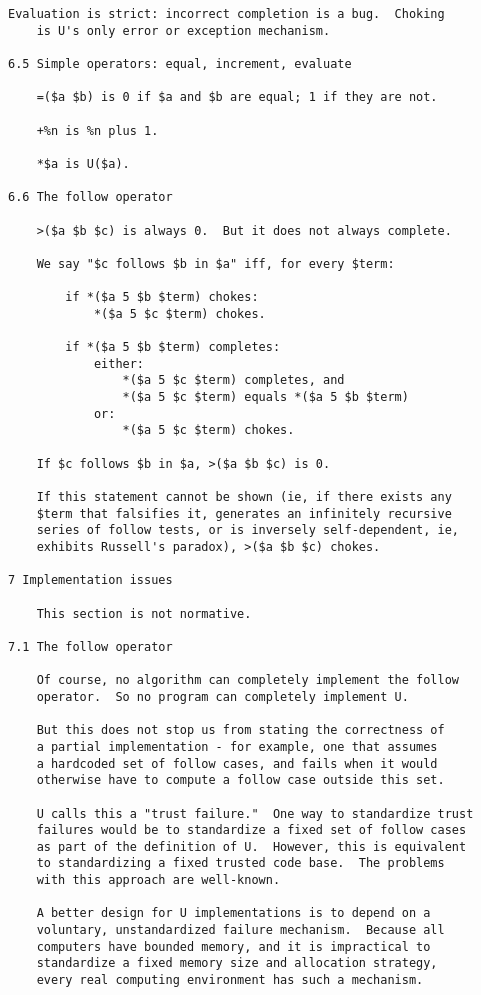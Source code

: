 \documentclass[twoside]{article}
\begin{document}
\begin{lstlisting}[label=lst:u,caption={U: Definition.  The earliest extant Nock.  Only layout has been changed for print.},style=listingcode]
    Evaluation is strict: incorrect completion is a bug.  Choking
    is U's only error or exception mechanism.

6.5 Simple operators: equal, increment, evaluate

    =($a $b) is 0 if $a and $b are equal; 1 if they are not.

    +%n is %n plus 1.

    *$a is U($a).

6.6 The follow operator

    >($a $b $c) is always 0.  But it does not always complete.

    We say "$c follows $b in $a" iff, for every $term:

        if *($a 5 $b $term) chokes:
            *($a 5 $c $term) chokes.

        if *($a 5 $b $term) completes:
            either:
                *($a 5 $c $term) completes, and
                *($a 5 $c $term) equals *($a 5 $b $term)
            or:
                *($a 5 $c $term) chokes.

    If $c follows $b in $a, >($a $b $c) is 0.

    If this statement cannot be shown (ie, if there exists any
    $term that falsifies it, generates an infinitely recursive
    series of follow tests, or is inversely self-dependent, ie,
    exhibits Russell's paradox), >($a $b $c) chokes.

7 Implementation issues

    This section is not normative.

7.1 The follow operator

    Of course, no algorithm can completely implement the follow
    operator.  So no program can completely implement U.

    But this does not stop us from stating the correctness of
    a partial implementation - for example, one that assumes
    a hardcoded set of follow cases, and fails when it would
    otherwise have to compute a follow case outside this set.

    U calls this a "trust failure."  One way to standardize trust
    failures would be to standardize a fixed set of follow cases
    as part of the definition of U.  However, this is equivalent
    to standardizing a fixed trusted code base.  The problems
    with this approach are well-known.

    A better design for U implementations is to depend on a
    voluntary, unstandardized failure mechanism.  Because all
    computers have bounded memory, and it is impractical to
    standardize a fixed memory size and allocation strategy,
    every real computing environment has such a mechanism.


\end{lstlisting}
\end{document}

